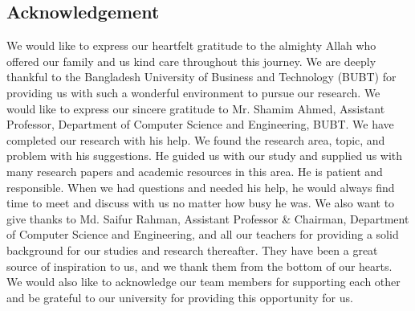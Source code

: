 \begin{center}
    \section*{Acknowledgement}
\end{center}
\large We would like to express our heartfelt gratitude to the almighty Allah who offered our family and us kind care throughout this journey. We are deeply thankful to the Bangladesh University of Business and Technology (BUBT) for providing us with such a wonderful environment to pursue our research. We would like to express our sincere gratitude to Mr. Shamim Ahmed, Assistant Professor, Department of Computer Science and Engineering, BUBT. We have completed our research with his help. We found the research area, topic, and problem with his suggestions. He guided us with our study and supplied us with many research papers and academic resources in this area. He is patient and responsible. When we had questions and needed his help, he would always find time to meet and discuss with us no matter how busy he was. We also want to give thanks to Md. Saifur Rahman, Assistant Professor \& Chairman, Department of Computer Science and Engineering, and all our teachers for providing a solid background for our studies and research thereafter. They have been a great source of inspiration to us, and we thank them from the bottom of our hearts. We would also like to acknowledge our team members for supporting each other and be grateful to our university for providing this opportunity for us.